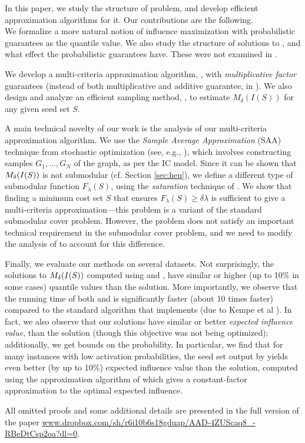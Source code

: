 In this paper, we study the structure of \infprob{} problem, and develop efficient approximation
algorithms for it. Our contributions are the following.\\
{}  We formalize a more natural notion of influence maximization with probabilistic
guarantees as the quantile value. We also study the structure of solutions to \infprob{}, and what
 effect the probabilistic guarantees have. These were not examined in \cite{zhang:kdd14}.

We develop a multi-criteria approximation algorithm, \multicritalgo{}, with \emph{multiplicative
factor} guarantees (instead of both multiplicative and additive guarantee, in \cite{zhang:kdd14}).
We also design and
analyze an efficient sampling method, \infprobheu{}, to estimate $M_{\delta}(I(S))$ for any given
 seed set $S$.

A main technical novelty of our work is the analysis of our multi-criteria approximation algorithm.
We use the \emph{Sample Average Approximation} (SAA) technique from stochastic optimization
(see, e.g., \cite{swamy:sigact06}), which involves constructing samples $G_1,\ldots,G_N$ of
the graph, as per the IC model. Since it can be shown that $\mbox{$M_{\delta}(I(S))$}$ is not submodular (cf. Section \ref{sec:heu}), we define a
different type of submodular function $F_{\lambda}(S)$, using the \emph{saturation} technique of \cite{krause:jmlr08}. 
We show that finding a minimum cost set $S$ that ensures $F_{\lambda}(S)\geq \delta\lambda$ is sufficient to give a multi-criteria approximation---this
problem is a variant of the standard submodular cover problem. However, the problem does not
satisfy an important technical requirement in the submodular cover problem, and we need to
modify the analysis of \cite{wolsey:combinatorica82} to account for this difference.

Finally, we evaluate our methods on several datasets.  Not surprisingly, the solutions to
$\mbox{$M_{\delta}(I(S))$}$ computed using \multicritalgo{} and \infprobheu{}, have similar or higher (up to 10\% in some cases) quantile values than the \infmax{} solution. More importantly, we observe that the running time of both \multicritalgo{} and \infprobheu{} is significantly faster (about 10 times faster) compared to the standard algorithm   that implements \infmax{} (due to Kempe et al \cite{v011a004}).  In fact,  we also observe that our solutions have similar or better \emph{expected influence value}, than the \infmax{} solution (though this objective was not being optimized); additionally, we get bounds on the probability.
In particular, we find that for many instances with low activation probabilities, the seed
set output by \multicritalgo{} yields even better (by up to 10\%) expected influence value than
the \infmax{} solution, computed using the approximation algorithm of \cite{kkt-2003} which
gives a constant-factor approximation to the optimal expected influence.

All omitted proofs and some additional details are  presented in the full version
of the paper \url{www.dropbox.com/sh/r6i10b6s18gduap/AAD-4ZUScaq8_-RBeDtCsp2oa?dl=0}.
